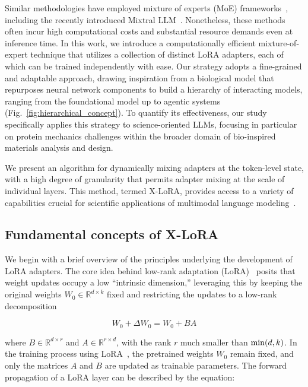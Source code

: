 Similar methodologies have employed mixture of experts (MoE) frameworks~\cite{Jacobs1991AdaptiveExperts,Hampshire1992TheRecognition,Jordan1994HierarchicalAlgorithm}, including the recently introduced Mixtral LLM~\cite{Jiang2024MixtralExperts}. Nonetheless, these methods often incur high computational costs and substantial resource demands even at inference time. In this work, we introduce a computationally efficient mixture-of-expert technique that utilizes a collection of distinct LoRA adapters, each of which can be trained independently with ease. Our strategy adopts a fine-grained and adaptable approach, drawing inspiration from a biological model that repurposes neural network components to build a hierarchy of interacting models, ranging from the foundational model up to agentic systems (Fig.~\ref{fig:hierarchical_concept}). To quantify its effectiveness, our study specifically applies this strategy to science-oriented LLMs, focusing in particular on protein mechanics challenges within the broader domain of bio-inspired materials analysis and design.

We present an algorithm for dynamically mixing adapters at the token-level state, with a high degree of granularity that permits adapter mixing at the scale of individual layers. This method, termed X-LoRA, provides access to a variety of capabilities crucial for scientific applications of multimodal language modeling~\cite{Hu2023DeepScience,Buehler2023AMetamaterials,Buehler2022ProteinNetworks,}. 

\subsection{Fundamental concepts of X-LoRA}

We begin with a brief overview of the principles underlying the development of LoRA adapters. The core idea behind low-rank adaptation (LoRA)~\cite{hu2021lora} posits that weight updates occupy a low “intrinsic dimension,” leveraging this by keeping the original weights $W_0 \in \mathbb{R}^{d \times k}$ fixed and restricting the updates to a low-rank decomposition

\begin{equation}
W_0 + \Delta W_0 = W_0 + BA 
\end{equation}

where $B \in \mathbb{R}^{d \times r}$ and $A \in \mathbb{R}^{r \times d}$, with the rank $r$ much smaller than ${\rm min}(d,k)$. In the training process using LoRA~\cite{hu2021lora}, the pretrained weights $W_0$ remain fixed, and only the matrices $A$ and $B$ are updated as trainable parameters. The forward propagation of a LoRA layer can be described by the equation:

